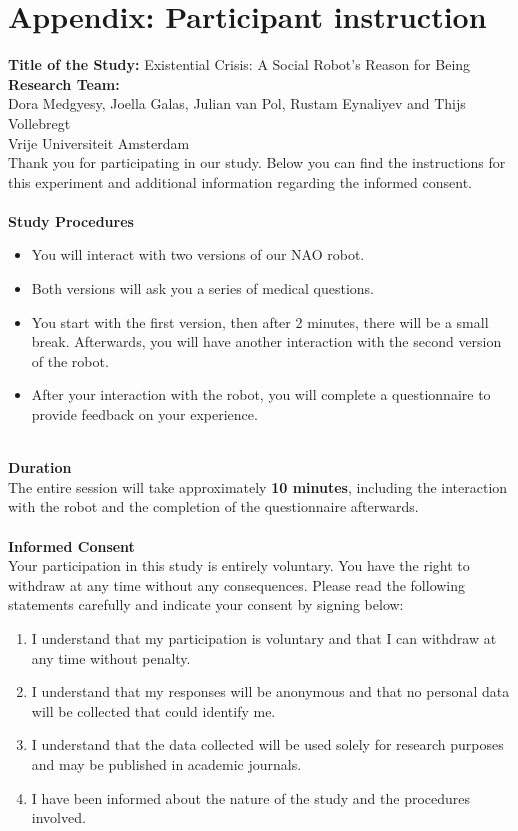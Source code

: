 \documentclass[runningheads]{llncs}
\begin{document}
\newpage
\appendix
\section{Appendix: Participant instruction}\label{Appendix A: Participant instruction}

\noindent
\textbf{Title of the Study:} Existential Crisis: A Social Robot’s Reason for Being \\

\noindent
\textbf{Research Team:} \\
Dora Medgyesy, Joella Galas, Julian van Pol, Rustam Eynaliyev and Thijs Vollebregt \\
Vrije Universiteit Amsterdam\\

\noindent
Thank you for participating in our study. Below you can find the instructions for this experiment and additional information regarding the informed consent.\\\\
\textbf{Study Procedures}
\begin{itemize}
    \item You will interact with two versions of our NAO robot.
    \item Both versions will ask you a series of medical questions.
    \item You start with the first version, then after 2 minutes, there will be a small break. Afterwards, you will have another interaction with the second version of the robot.
    \item After your interaction with the robot, you will complete a questionnaire to provide feedback on your experience.
\end{itemize}
\\
\textbf{Duration}
\\
The entire session will take approximately \textbf{10 minutes}, including the interaction with the robot and the completion of the questionnaire afterwards.\\\\
\textbf{Informed Consent}\\
Your participation in this study is entirely voluntary. You have the right to withdraw at any time without any consequences. Please read the following statements carefully and indicate your consent by signing below:
\begin{enumerate}
    \item I understand that my participation is voluntary and that I can withdraw at any time without penalty.
    \item I understand that my responses will be anonymous and that no personal data will be collected that could identify me.
    \item I understand that the data collected will be used solely for research purposes and may be published in academic journals.
    \item I have been informed about the nature of the study and the procedures involved.
\end{enumerate}
\end{document}
